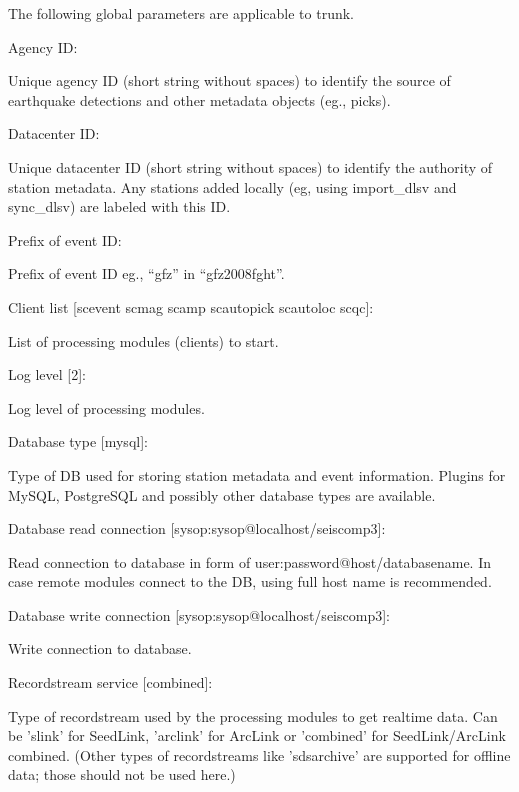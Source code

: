 \documentclass[11pt,a4paper,titlepage]{article}
\newcommand{\pkg}[1]{\textsf{#1}}
\begin{document}
The following global parameters are applicable to \pkg{trunk}.
\begin{interface}
\item Agency ID:

Unique agency ID (short string without spaces) to identify the source of
earthquake detections and other metadata objects (eg., picks).

\item Datacenter ID:

Unique datacenter ID (short string without spaces) to identify the
authority of station metadata. Any stations added locally (eg, using
import\_dlsv and sync\_dlsv) are labeled with this ID.

\item Prefix of event ID:

Prefix of event ID eg., ``gfz'' in ``gfz2008fght''.

\item Client list [scevent scmag scamp scautopick scautoloc scqc]:

List of processing modules (clients) to start.

\item Log level [2]:

Log level of processing modules.

\item Database type [mysql]:

Type of DB used for storing station metadata and event information. Plugins
for MySQL, PostgreSQL and possibly other database types are available.

\item Database read connection [sysop:sysop@localhost/seiscomp3]:

Read connection to database in form of user:password@host/databasename. In
case remote modules connect to the DB, using full host name is recommended.

\item Database write connection [sysop:sysop@localhost/seiscomp3]:

Write connection to database.

\item Recordstream service [combined]:

Type of recordstream used by the processing modules to get realtime data.
Can be 'slink' for SeedLink, 'arclink' for ArcLink or 'combined' for
SeedLink/ArcLink combined. (Other types of recordstreams like 'sdsarchive'
are supported for offline data; those should not be used here.)


\end{interface}
\end{document}

